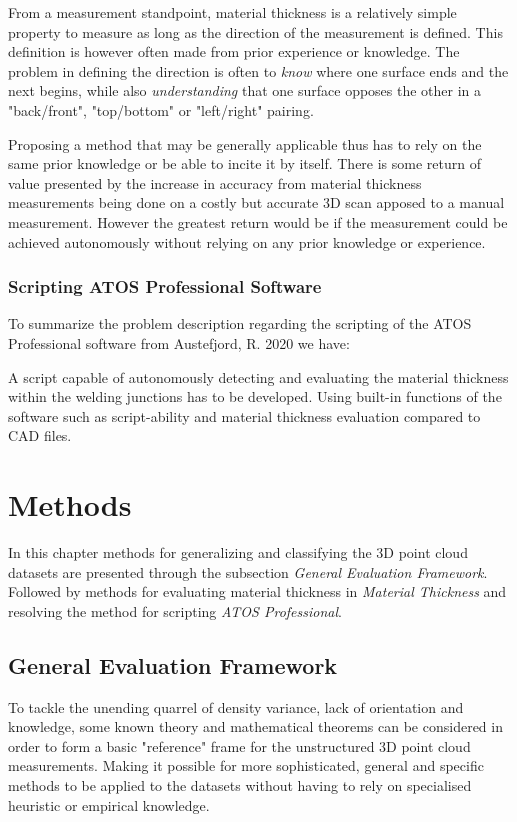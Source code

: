 \documentclass[%
]{USN-MSc}
\begin{document}
From a measurement standpoint, material thickness is a relatively simple property to measure as long as the direction of the measurement is defined. This definition is however often made from prior experience or knowledge. The problem in defining the direction is often to \textit{know} where one surface ends and the next begins, while also \textit{understanding} that one surface opposes the other in a "back/front", "top/bottom" or "left/right" pairing. 

Proposing a method that may be generally applicable thus has to rely on the same prior knowledge or be able to incite it by itself. There is some return of value presented by the increase in accuracy from material thickness measurements being done on a costly but accurate 3D scan apposed to a manual measurement. However the greatest return would be if the measurement could be achieved autonomously without relying on any prior knowledge or experience.

\subsection{Scripting ATOS Professional Software}
\label{sub:Scripting ATOS Professional Software}
To summarize the problem description regarding the scripting of the ATOS Professional software from Austefjord, R. 2020 \cite{Adaptive-Welding-Automation} we have:

A script capable of autonomously detecting and evaluating the material thickness within the welding junctions has to be developed. Using built-in functions of the software such as script-ability and material thickness evaluation compared to CAD files.


\chapter{Methods}
\label{ch:Methods}

In this chapter methods for generalizing and classifying the 3D point cloud datasets are presented through the subsection \textit{General Evaluation Framework}. Followed by methods for evaluating material thickness in \textit{Material Thickness} and resolving the method for scripting \textit{ATOS Professional}.


\section{General Evaluation Framework}
\label{sec:General Evaluation Framework}
To tackle the unending quarrel of density variance, lack of orientation and knowledge, some known theory and mathematical theorems can be considered in order to form a basic "reference" frame for the unstructured 3D point cloud measurements. Making it possible for more sophisticated, general and specific methods to be applied to the datasets without having to rely on specialised heuristic or empirical knowledge.
\end{document}
